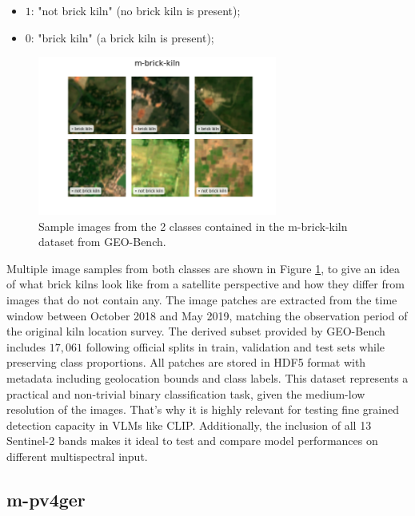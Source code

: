 \documentclass[a4paper, oneside, english]{sapthesis} %
\begin{document}
\begin{itemize}
    \item $1$: "not brick kiln" (no brick kiln is present);
    \item $0$: "brick kiln" (a brick kiln is present);
\end{itemize}

\vspace{-0.3cm}

\begin{figure}[h]
    \centering
    \includegraphics[width=0.7\textwidth]{img/m-brick-kiln_image_grid.png}
    \vspace{-0.5cm}
    \caption{\normalsize Sample images from the 2 classes contained in the m-brick-kiln dataset from GEO-Bench.}
    \label{fig:brickgrid}
\end{figure}

Multiple image samples from both classes are shown in Figure \ref{fig:brickgrid}, to give an idea of what brick kilns look like from a satellite perspective and how they differ from images that do not contain any. The image patches are extracted from the time window between October 2018 and May 2019, matching the observation period of the original kiln location survey. The derived subset provided by GEO-Bench includes $17,061$ following official splits in train, validation and test sets while preserving class proportions. All patches are stored in HDF5 format with metadata including geolocation bounds and class labels.
This dataset represents a practical and non-trivial binary classification task, given the medium-low resolution of the images. That's why it is highly relevant for testing fine grained detection capacity in VLMs like CLIP. Additionally, the inclusion of all 13 Sentinel-2 bands makes it ideal to test and compare model performances on different multispectral input.


\subsection{m-pv4ger}
\end{document}
